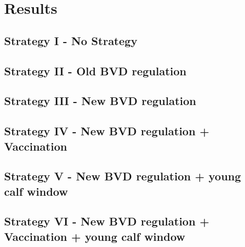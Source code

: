 \chapter{Results}
\section{Strategy I - No Strategy}
\section{Strategy II - Old BVD regulation}
\section{Strategy III - New BVD regulation}
\section{Strategy IV - New BVD regulation + Vaccination}
\section{Strategy V - New BVD regulation + young calf window}
\section{Strategy VI - New BVD regulation + Vaccination + young calf window} 